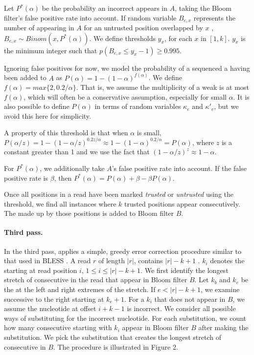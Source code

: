 \documentclass{bmcart}
\begin{document}
Let $P^*(\alpha)$ be the probability an incorrect \kmer appears in $A$, taking the Bloom filter's false positive rate into account.  If random variable $B_{e,x}$ represents the number of \kmers appearing in $A$ for an untrusted position overlapped by $x$ \kmers, $B_{e,x} \sim Binom(x,P^*(\alpha))$.  We define thresholds $y_x$, for each $x$ in $[1, k]$.  $y_x$ is the minimum integer such that $p(B_{e,x}\le y_x - 1)\ge 0.995$.

Ignoring false positives for now, we model the probability of a sequenced a \kmer having been added to $A$ as $P(\alpha)=1-(1-\alpha)^{f(\alpha)}$.  We define $f(\alpha)=max\{2,0.2/\alpha\}$.  That is, we assume the multiplicity of a weak \kmer is at most $f(\alpha)$, which will often be a conservative assumption, especially for small $\alpha$.  It is also possible to define $P(\alpha)$ in terms of random variables $\kappa_e$ and $\kappa'_e$, but we avoid this here for simplicity.

A property of this threshold is that when $\alpha$ is small, $P(\alpha/z)=1-(1-\alpha/z)^{0.2z/\alpha}\approx 1-(1-\alpha)^{0.2/\alpha}=P(\alpha)$, where $z$ is a constant greater than 1 and we use the fact that $(1-\alpha/z)^z\approx 1-\alpha$.

For $P^*(\alpha)$, we additionally take $A$'s false positive rate into account.  If the false positive rate is $\beta$, then $P^*(\alpha)=P(\alpha)+\beta-\beta P(\alpha)$.

Once all positions in a read have been marked \emph{trusted} or \emph{untrusted} using the threshold, we find all instances where $k$ trusted positions appear consecutively.  The \kmer made up by those positions is added to Bloom filter $B$.

\paragraph{Third pass.} 
In the third pass, \tool applies a simple, greedy error correction procedure similar to that used in BLESS \cite{heo2014bless}.
A read $r$ of length $|r|$, contains $|r|-k+1$ \kmers.
$k_i$ denotes the \kmer starting at read position $i$, $1\le i\le|r|-k+1$.
We first identify the longest stretch of consecutive \kmers in the read that appear in Bloom filter $B$.
Let $k_b$ and $k_e$ be the \kmers at the left and right extremes of the stretch.
If $e < |r|-k+1$, we examine successive \kmers to the right starting at $k_e+1$.
For a \kmer $k_i$ that does not appear in $B$, we assume the nucleotide at offset $i+k-1$ is incorrect.
We consider all possible ways of substituting for the incorrect nucleotide.
For each substitution, we count how many consecutive \kmers starting with $k_i$ appear in Bloom filter $B$ after making the substitution.
We pick the substitution that creates the longest stretch of consecutive \kmers in $B$. The procedure is illustrated in Figure 2.  
\end{document}
